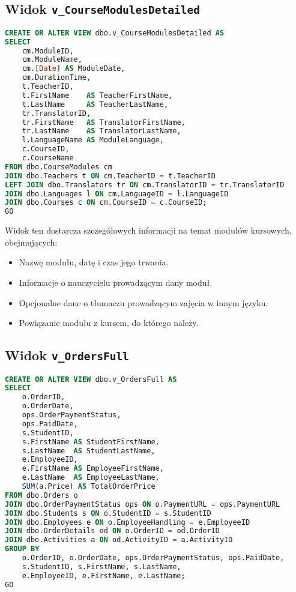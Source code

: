 \documentclass[12pt]{article}
\begin{document}
\subsection{Widok \texttt{v\_CourseModulesDetailed}}

\begin{lstlisting}[language=SQL]
CREATE OR ALTER VIEW dbo.v_CourseModulesDetailed AS
SELECT
    cm.ModuleID,
    cm.ModuleName,
    cm.[Date] AS ModuleDate,
    cm.DurationTime,
    t.TeacherID,
    t.FirstName    AS TeacherFirstName,
    t.LastName     AS TeacherLastName,
    tr.TranslatorID,
    tr.FirstName   AS TranslatorFirstName,
    tr.LastName    AS TranslatorLastName,
    l.LanguageName AS ModuleLanguage,
    c.CourseID,
    c.CourseName
FROM dbo.CourseModules cm
JOIN dbo.Teachers t ON cm.TeacherID = t.TeacherID
LEFT JOIN dbo.Translators tr ON cm.TranslatorID = tr.TranslatorID
JOIN dbo.Languages l ON cm.LanguageID = l.LanguageID
JOIN dbo.Courses c ON cm.CourseID = c.CourseID;
GO
\end{lstlisting}

\noindent Widok ten dostarcza szczegółowych informacji na temat modułów kursowych, obejmujących:
\begin{itemize}
    \item Nazwę modułu, datę i czas jego trwania.
    \item Informacje o nauczycielu prowadzącym dany moduł.
    \item Opcjonalne dane o tłumaczu prowadzącym zajęcia w innym języku.
    \item Powiązanie modułu z kursem, do którego należy.
\end{itemize}


\subsection{Widok \texttt{v\_OrdersFull}}

\begin{lstlisting}[language=SQL]
CREATE OR ALTER VIEW dbo.v_OrdersFull AS
SELECT
    o.OrderID,
    o.OrderDate,
    ops.OrderPaymentStatus,
    ops.PaidDate,
    s.StudentID,
    s.FirstName AS StudentFirstName,
    s.LastName  AS StudentLastName,
    e.EmployeeID,
    e.FirstName AS EmployeeFirstName,
    e.LastName  AS EmployeeLastName,
    SUM(a.Price) AS TotalOrderPrice
FROM dbo.Orders o
JOIN dbo.OrderPaymentStatus ops ON o.PaymentURL = ops.PaymentURL
JOIN dbo.Students s ON o.StudentID = s.StudentID
JOIN dbo.Employees e ON o.EmployeeHandling = e.EmployeeID
JOIN dbo.OrderDetails od ON o.OrderID = od.OrderID
JOIN dbo.Activities a ON od.ActivityID = a.ActivityID
GROUP BY
    o.OrderID, o.OrderDate, ops.OrderPaymentStatus, ops.PaidDate,
    s.StudentID, s.FirstName, s.LastName,
    e.EmployeeID, e.FirstName, e.LastName;
GO
\end{lstlisting}
\end{document}
